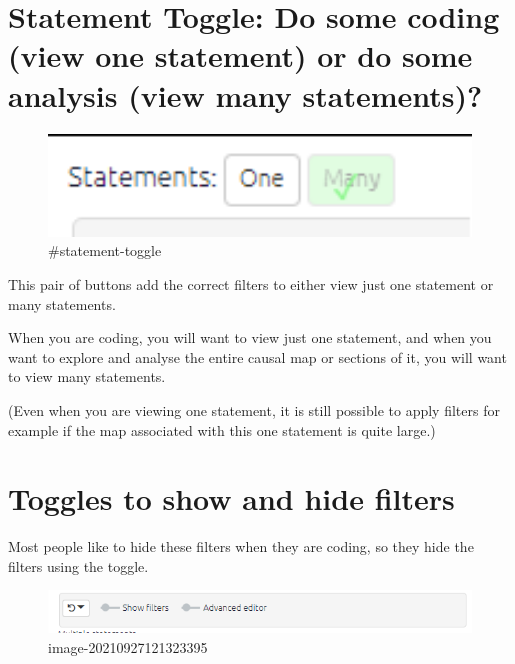 \documentclass[
]{book}
\begin{document}
\hypertarget{statement-toggle-do-some-coding-view-one-statement-or-do-some-analysis-view-many-statements}{%
\section{Statement Toggle: Do some coding (view one statement) or do some analysis (view many statements)?}\label{statement-toggle-do-some-coding-view-one-statement-or-do-some-analysis-view-many-statements}}

\begin{figure}
\centering
\includegraphics[width=6.77083in,height=\textheight]{_assets/00600-tour0.png}
\caption{\#statement-toggle}
\end{figure}

This pair of buttons add the correct filters to either view just one statement or many statements.

When you are coding, you will want to view just one statement, and when you want to explore and analyse the entire causal map or sections of it, you will want to view many statements.

(Even when you are viewing one statement, it is still possible to apply filters for example if the map associated with this one statement is quite large.)

\hypertarget{toggles-to-show-and-hide-filters}{%
\section{Toggles to show and hide filters}\label{toggles-to-show-and-hide-filters}}

Most people like to hide these filters when they are coding, so they hide the filters using the toggle.

\begin{figure}
\centering
\includegraphics[width=6.77083in,height=\textheight]{_assets/image-20210927121323395.png}
\caption{image-20210927121323395}
\end{figure}
\end{document}
